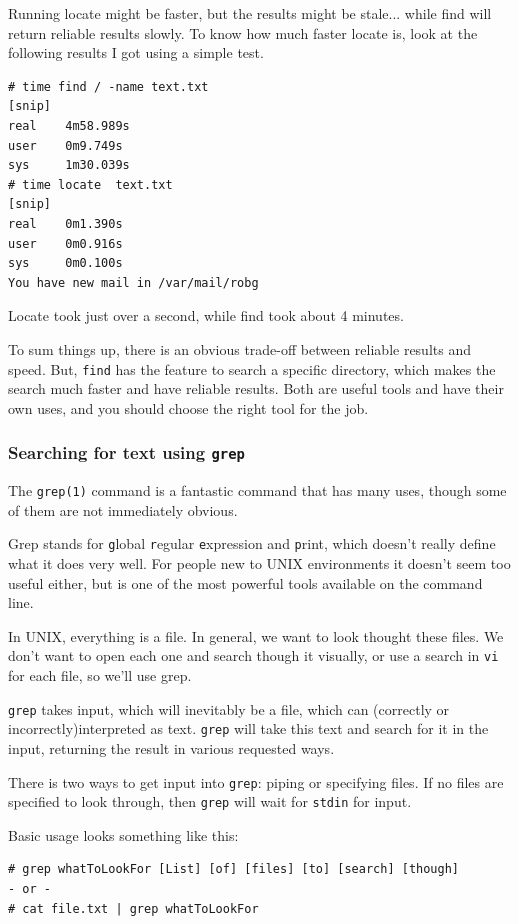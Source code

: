 Running locate might be faster, but the results might be stale... while 
find will return reliable results slowly. To know how much faster locate is, look at the 
following results I got using a simple test.
{\tt \begin {verbatim}
# time find / -name text.txt
[snip]
real    4m58.989s
user    0m9.749s
sys     1m30.039s
# time locate  text.txt
[snip]
real    0m1.390s
user    0m0.916s
sys     0m0.100s
You have new mail in /var/mail/robg
\end{verbatim}
}
Locate took just over a second, while find took about 4 minutes. 


To sum things up, there is an obvious trade-off between reliable results and speed. But, 
{\tt find} has the feature to search a specific directory, which makes the search much faster 
and have reliable results. Both are useful tools and have their own uses, and you should 
choose the right tool for the job.

\subsubsection{Searching for text using {\tt grep}}
The {\tt grep(1)} command is a fantastic command that has 
many uses, though some of them are not immediately obvious.

Grep stands for  {\tt g}lobal {\tt r}egular {\tt e}xpression and
{\tt p}rint, which doesn't really define what it does very well. 
For people new to UNIX environments it doesn't seem too 
useful either, but is one of the most powerful tools available 
on the command line.

In UNIX, everything is a file.  In general, we want to look 
thought these files. We don't want to open each one and
search though it visually, or use a search in {\tt vi} for each 
file, so we'll use grep.

{\tt grep} takes input, which will inevitably be a file, which 
can (correctly or incorrectly)interpreted as text. {\tt grep} will take this
text and search for it in the input, returning the result in various requested
ways.

There is two ways to get input into {\tt grep}: piping or specifying files. 
If no files are specified to look through, then {\tt grep} will wait for {\tt stdin} for input.

Basic usage looks something like this:
{\tt \begin{verbatim}
# grep whatToLookFor [List] [of] [files] [to] [search] [though]
- or -
# cat file.txt | grep whatToLookFor
\end{verbatim}
}

